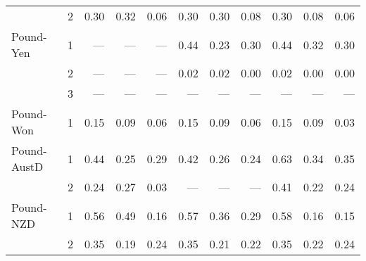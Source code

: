 \documentclass[12pt]{article}
\begin{document}
\begin{table}
\begin{threeparttable}
\begin{tabular}[c]{l c r r r | r r r | r r r}
		      & 2 & 0.30  & 0.32  & 0.06  & 0.30  & 0.30  & 0.08  & 0.30  & 0.08  & 0.06  \\
\noalign{\smallskip} \noalign{\smallskip}
Pound-Yen & 1 & ---  & ---  & ---  & 0.44  & 0.23  & 0.30  & 0.44  & 0.32  & 0.30  \\
		  & 2 & ---  & ---  & ---  & 0.02  & 0.02  & 0.00  & 0.02  & 0.00  & 0.00  \\
		  & 3 & ---  & ---  & ---  & ---  & ---  & ---  & ---  & ---  & ---  \\
\noalign{\smallskip} \noalign{\smallskip}
Pound-Won & 1 & 0.15  & 0.09  & 0.06  & 0.15  & 0.09  & 0.06  & 0.15  & 0.09  & 0.03  \\
\noalign{\smallskip} \noalign{\smallskip}
Pound-AustD & 1 & 0.44  & 0.25  & 0.29  & 0.42  & 0.26  & 0.24  & 0.63  & 0.34  & 0.35  \\
            & 2 & 0.24  & 0.27  & 0.03  & ---  & ---  & ---  & 0.41  & 0.22  & 0.24  \\
\noalign{\smallskip} \noalign{\smallskip}
Pound-NZD & 1 & 0.56  & 0.49  & 0.16  & 0.57  & 0.36  & 0.29  & 0.58  & 0.16  & 0.15  \\
		  & 2 & 0.35  & 0.19  & 0.24  & 0.35  & 0.21  & 0.22  & 0.35  & 0.22  & 0.24  \\
\hline \hline
	\end{tabular}
\end{threeparttable}
\end{table}
\end{document}
